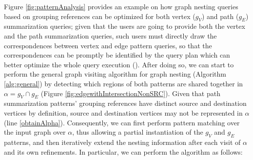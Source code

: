 Figure \vref{fig:patternAnalysis} provides an example on how  graph nesting queries based on grouping references can be optimized for both vertex ($g_V$) and path ($g_E$) summarization queries; given that the users are going to provide both the vertex and the path summarization queries, such users must directly draw the correspondences between vertex and edge pattern queries, so that the correspondences can be promptly be identified by the query plan which can better optimize the whole query execution (). After doing so, we can start to perform the general graph visiting algorithm for graph nesting (Algorithm \ref{alg:general}) by detecting which regions of both patterns are shared together in $\alpha=g_V\cap g_E$ (Figure \ref{fig:edgewithIntersectionNonSRC}). Given that path summarization patterns' grouping references have distinct source and destination vertices  by definition, source and destination vertices may not be represented in $\alpha$ (line \ref{obtainAlpha}). Consequently, we can first perform pattern matching over the input graph over $\alpha$, thus allowing a partial instantiation of the $g_V$ and $g_E$ patterns, and then iteratively extend the nesting information after each visit of $\alpha$ and  its own refinements. In particular, we can perform the algorithm  as follows:

